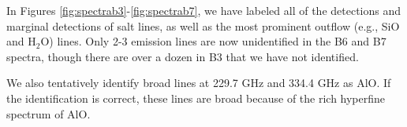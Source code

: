 \documentclass[12pt]{article}
\begin{document}
In Figures \ref{fig:spectrab3}-\ref{fig:spectrab7}, we have labeled all of the
detections and marginal detections of salt lines, as well as the most prominent
outflow (e.g., SiO and H$_2$O) lines.  Only 2-3 emission lines are now
unidentified in the B6 and B7 spectra, though there are over a dozen in B3 that
we have not identified. 

We also tentatively identify broad lines at 229.7 GHz and 334.4 GHz as AlO.  If
the identification is correct, these lines are broad because of the rich hyperfine
spectrum of AlO.

%
\end{document}
